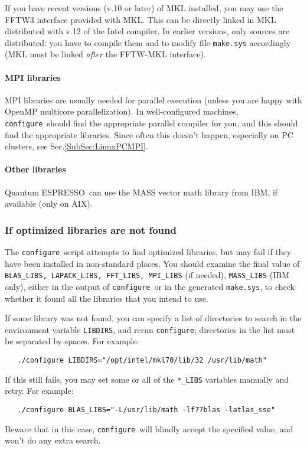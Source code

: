 \documentclass[12pt,a4paper]{article}
\def\qe{{\sc Quantum ESPRESSO}}
\def\configure{\texttt{configure}}
\begin{document}
If you have recent versions (v.10 or later) of MKL installed, you 
may use the FFTW3 interface provided with MKL. This can be directly
linked in MKL distributed with v.12 of the Intel compiler. In earlier 
versions, only sources are distributed: you have to compile them and 
to modify file \texttt{make.sys} accordingly 
(MKL must be linked {\em after} the FFTW-MKL interface).

\paragraph{MPI libraries} 
MPI libraries are usually needed for parallel execution 
(unless you are happy with OpenMP multicore parallelization).
In well-configured machines, \configure\ should find the appropriate
parallel compiler for you, and this should find the appropriate
libraries. Since often this doesn't 
happen, especially on PC clusters, see Sec.\ref{SubSec:LinuxPCMPI}.

\paragraph{Other libraries}
\qe\ can use the MASS vector math
library from IBM, if available (only on AIX).

\subsubsection{If optimized libraries are not found}
The \configure\ script attempts to find optimized libraries, but may fail
if they have been installed in non-standard places. You should examine
the final value of \texttt{BLAS\_LIBS, LAPACK\_LIBS, FFT\_LIBS, MPI\_LIBS} (if needed),
\texttt{MASS\_LIBS} (IBM only), either in the output of \configure\ or in the generated
\texttt{make.sys}, to check whether it found all the libraries that you intend to use.
    
If some library was not found, you can specify a list of directories to search
in the environment variable \texttt{LIBDIRS}, 
and rerun \configure; directories in the
list must be separated by spaces. For example:
\begin{verbatim}
   ./configure LIBDIRS="/opt/intel/mkl70/lib/32 /usr/lib/math"
\end{verbatim}
If this still fails, you may set some or all of the \texttt{*\_LIBS} variables manually
and retry. For example:
\begin{verbatim}
   ./configure BLAS_LIBS="-L/usr/lib/math -lf77blas -latlas_sse"
\end{verbatim}
Beware that in this case, \configure\ will blindly accept the specified value,
and won't do any extra search. 
    
\end{document}
